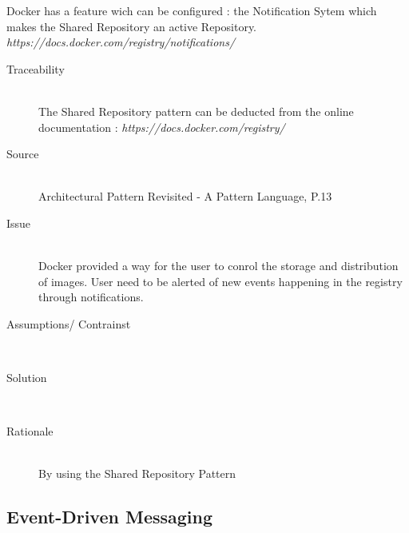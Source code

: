 Docker has a feature wich can be configured : the Notification Sytem which makes the Shared Repository an active Repository.
\textit{https://docs.docker.com/registry/notifications/}

\begin{description}
\item[Traceability]~\\
The Shared Repository pattern can be deducted from the online documentation : \textit{https://docs.docker.com/registry/}

\item[Source]~\\
Architectural Pattern Revisited - A Pattern Language, P.13 \cite{avgeriou2005architectural}

\item[Issue]~\\
Docker provided a way for the user to conrol the storage and distribution of images.
User need to be alerted of new events happening in the registry through notifications. %

\item[Assumptions/ Contrainst]~\\

\item[Solution]~\\ %

\item[Rationale]~\\ %
By using the Shared Repository Pattern 

\end{description}

\subsection{Event-Driven Messaging}

